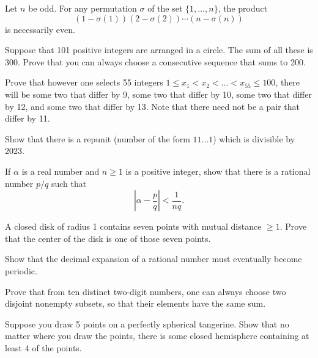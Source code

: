 \documentclass{article}
\begin{document}
\begin{exercise}
    Let \(n\) be odd.
    For any permutation \(\sigma\) of the set \(\{1,\ldots,n\}\), the product
    \[(1-\sigma(1))(2-\sigma(2))\cdots(n-\sigma(n))\]
    is necessarily even.
\end{exercise}

\begin{exercise}
    Suppose that 101 positive integers are arranged in a circle.
    The sum of all these is 300.
    Prove that you can always choose a consecutive sequence that sums to 200.
\end{exercise}

\begin{exercise}
    Prove that however one selects 55 integers \(1\leq x_1 < x_2 < \ldots < x_{55} \leq 100\), there will be some two that differ by 9, some two that differ by 10, some two that differ by 12, and some two that differ by 13.
    Note that there need not be a pair that differ by 11.
\end{exercise}

\begin{exercise}
    Show that there is a repunit (number of the form \(11\ldots 1\)) which is divisible by 2023.
\end{exercise}

\begin{exercise}
    If \(\alpha\) is a real number and \(n\geq 1\) is a positive integer, show that there is a rational number \(p/q\) such that
    \[\left|\alpha-\frac{p}{q}\right|<\frac{1}{nq}.\]
\end{exercise}

\begin{exercise}
    A closed disk of radius 1 contains seven points with mutual distance \(\geq 1\).
    Prove that the center of the disk is one of those seven points.
\end{exercise}

\begin{exercise}
    Show that the decimal expansion of a rational number must eventually become periodic.
\end{exercise}

\begin{exercise}
    Prove that from ten distinct two-digit numbers, one can always choose two disjoint nonempty subsets, so that their elements have the same sum.
\end{exercise}

\begin{exercise} %
    Suppose you draw 5 points on a perfectly spherical tangerine.
    Show that no matter where you draw the points, there is some closed hemisphere containing at least 4 of the points.
\end{exercise}
\end{document}
